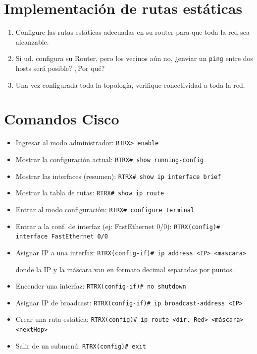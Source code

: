 \documentclass[a4paper,10pt]{article}
\begin{document}
\section{Implementación de rutas estáticas}

\begin{enumerate}
    \item Configure las rutas estáticas adecuadas en su router para que toda la red sea alcanzable.
    \item Si ud. configura su Router, pero los vecinos aún no, ¿enviar un \texttt{ping} entre dos hosts será posible? ¿Por qué?
    \item Una vez configurada toda la topología, verifique conectividad a toda la red.
\end{enumerate}


\appendix

\section{Comandos Cisco}

\begin{itemize}
    \item Ingresar al modo administrador:
\texttt{RTRX> enable}
    \item Mostrar la configuración actual:
    \texttt{RTRX# show running-config}
    \item Mostrar las interfaces (resumen): \texttt{RTRX# show ip interface brief}
    \item Mostrar la tabla de rutas:
    \texttt{RTRX# show ip route}
    \item Entrar al modo configuración: \texttt{RTRX# configure terminal}
    \item Entrar a la conf. de interfaz (ej: FastEthernet 0/0): \texttt{RTRX(config)# interface FastEthernet 0/0}
    \item Asignar IP a una interfaz: \texttt{RTRX(config-if)# ip address <IP> <mascara>}
    
    donde la IP y la máscara van en formato decimal separadas por puntos.
    \item Encender una interfaz: \texttt{RTRX(config-if)# no shutdown}
    \item Asignar IP de broadcast: \texttt{RTRX(config-if)# ip broadcast-address <IP>}
    \item Crear una ruta estática: \texttt{RTRX(config)# ip route <dir. Red> <máscara> <nextHop>}
    \item Salir de un submenú: \texttt{RTRX(config)# exit}

\end{itemize}
\end{document}

